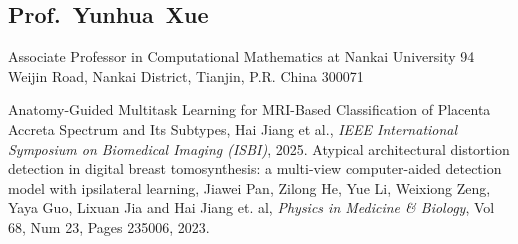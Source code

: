 \documentclass[11pt,a4paper, final]{moderncv}
\newcommand{\spacesubsection}{\vspace{0.2cm}}
\begin{document}
	\subsection{Prof.~Yunhua~Xue}
		\cvline{}
		{Associate Professor in Computational Mathematics at Nankai University}
		{94 Weijin Road, Nankai District, Tianjin, P.R. China 300071}





\clearpage
{}
\nocite{*}

	\begin{thebibliography}{99}
		\bibitem[1]{} Anatomy-Guided Multitask Learning for MRI-Based Classification of Placenta Accreta Spectrum and Its Subtypes, Hai Jiang et al., \emph{IEEE International Symposium on Biomedical Imaging (ISBI)}, 2025.
		\bibitem[2]{} Atypical architectural distortion detection in digital breast tomosynthesis: a multi-view computer-aided detection model with ipsilateral learning, Jiawei Pan, Zilong He, Yue Li, Weixiong Zeng, Yaya Guo, Lixuan Jia and Hai Jiang et. al, \emph{Physics in Medicine \& Biology}, Vol 68, Num 23, Pages 235006, 2023.
	\end{thebibliography}
% 
\end{document}
